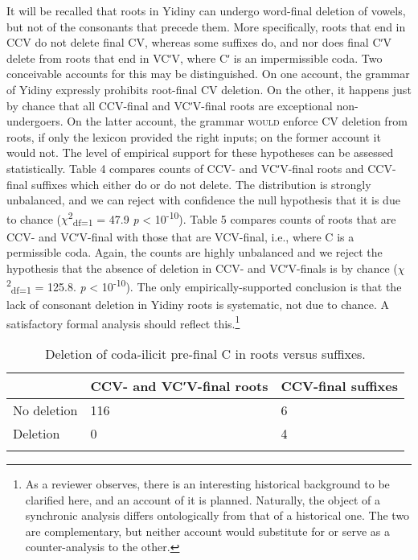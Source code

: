 \documentclass[output=paper,
modfonts
]{LSP/langsci}
\begin{document}
It will be recalled that roots in Yidiny can undergo word-final deletion of vowels, but not of the consonants that precede them. More specifically, roots that end in CCV do not delete final CV, whereas some suffixes do, and nor does final CʹV delete from roots that end in VCʹV, where Cʹ is an impermissible coda. Two conceivable accounts for this may be distinguished. On one account, the grammar of Yidiny expressly prohibits root-final CV deletion. On the other, it happens just by chance that all CCV-final and VCʹV-final roots are exceptional non-undergoers. On the latter account, the grammar \textsc{would} enforce CV deletion from roots, if only the lexicon provided the right inputs; on the former account it would not. The level of empirical support for these hypotheses can be assessed statistically. Table 4 compares counts of CCV- and VCʹV-final roots and CCV-final suffixes which either do or do not delete. The distribution is strongly unbalanced, and we can reject with confidence the null hypothesis that it is due to chance ($\chi $\textsuperscript{2}\textsubscript{df=1} = 47.9 \textit{p} {\textless} 10\textsuperscript{{}-10}). Table 5 compares counts of roots that are CCV- and VCʹV-final with those that are VCV-final, i.e., where C is a permissible coda. Again, the counts are highly unbalanced and we reject the hypothesis that the absence of deletion in CCV- and VCʹV-finals is by chance ($\chi $\textsuperscript{2}\textsubscript{df=1} = 125.8. \textit{p} {\textless} 10\textsuperscript{{}-10}). The only empirically-supported conclusion is that the lack of consonant deletion in Yidiny roots is systematic, not due to chance. A satisfactory formal analysis should reflect this.\footnote{As a reviewer observes, there is an interesting historical background to be clarified here, and an account of it is planned. Naturally, the object of a synchronic analysis differs ontologically from that of a historical one. The two are complementary, but neither account would substitute for or serve as a counter-analysis to the other.}

\begin{table}
\caption{Deletion of coda-ilicit pre-final C in roots versus suffixes.}
\begin{tabular}{lll}
\lsptoprule
 & \textbf{CCV- and VCʹV-final roots} & \textbf{CCV-final suffixes} \\
 \midrule
 No deletion & 116 & 6 \\
 Deletion & 0 & 4 \\
 \lspbottomrule
 \end{tabular}
 \end{table}
 
\end{document}
